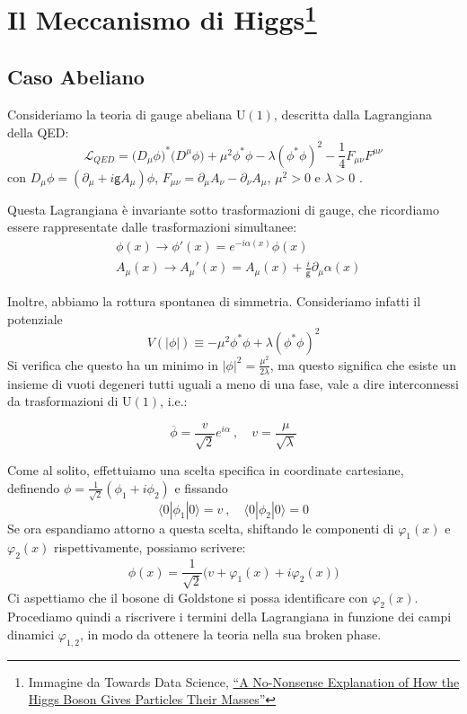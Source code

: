 \documentclass[../main.tex]{subfiles}
\begin{document}
\setchapterpreamble[u]{\margintoc}
\chapter[Il Meccanismo di Higgs]{Il Meccanismo di Higgs\footnote{Immagine da Towards Data Science, \href{https://towardsdatascience.com/a-no-nonsense-explanation-of-how-the-higgs-gives-particles-their-masses-639a0aba6d54}{“A No-Nonsense Explanation of How the Higgs Boson Gives Particles Their Masses”}}}
\fboxsep =1pt %

\section{Caso Abeliano}
Consideriamo la teoria di gauge abeliana U$(1)$, descritta dalla Lagrangiana della QED:
\[
\boxed{\mathscr{L}_{QED} = \big(D_\mu\phi\big)^\ast\big(D^\mu\phi\big) +\mu^2\phi^\ast\phi - \lambda (\phi^\ast\phi)^2 - \frac{1}{4}F_{\mu\nu}F^{\mu\nu}}
\]
con $D_\mu\phi = (\partial_\mu +i\mathsf gA_\mu)\phi$, $F_{\mu\nu}=\partial_\mu A_\nu - \partial_\nu A_\mu$, $\mu^2>0$ e $\lambda>0$ .

Questa Lagrangiana è invariante sotto trasformazioni di gauge, che ricordiamo essere rappresentate dalle trasformazioni simultanee:
\begin{align*}
    &\phi(x) \rightarrow \phi'(x)=e^{-i\alpha(x)}\phi(x)   \\
    &A_\mu(x) \rightarrow A_\mu'(x)= A_\mu(x) + \frac{i}{\mathsf g}\partial_\mu\alpha(x)
\end{align*}

Inoltre, abbiamo la rottura spontanea di simmetria. Consideriamo infatti il potenziale 
\[
V(|\phi|) \equiv -\mu^2\phi^\ast\phi + \lambda (\phi^\ast\phi)^2
\]
Si verifica che questo ha un minimo in $|\phi|^2 = \frac{\mu^2}{2\lambda}$, ma questo significa che esiste un insieme di vuoti degeneri tutti uguali a meno di una fase, vale a dire interconnessi da trasformazioni di U$(1)$, i.e.:

\[
\overline{\phi} = \frac{v}{\sqrt{2}}e^{i\alpha}~,\quad v=\frac{\mu}{\sqrt{\lambda}}
\]

Come al solito, effettuiamo una scelta specifica in coordinate cartesiane, definendo $\phi = \frac{1}{\sqrt{2}}(\phi_1+i\phi_2)$ e fissando
\[
\boxed{\langle0|\phi_1|0\rangle = v ~,\quad \langle0|\phi_2|0\rangle = 0}
\]
Se ora espandiamo attorno a questa scelta, shiftando le componenti di $\varphi_1(x)$ e $\varphi_2(x)$ rispettivamente, possiamo scrivere:
\[
\phi(x) = \frac{1}{\sqrt{2}}\big(v+\varphi_1(x)+i\varphi_2(x)\big)
\]
Ci aspettiamo che il bosone di Goldstone si possa identificare con $\varphi_2(x)$. Procediamo quindi a riscrivere i termini della Lagrangiana in funzione dei campi dinamici $\varphi_{1,2}$, in modo da ottenere la teoria nella sua broken phase.
\end{document}
